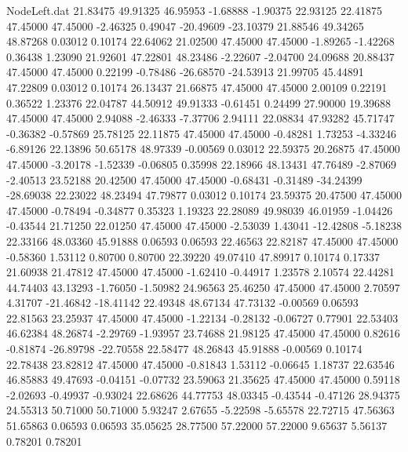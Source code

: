 \begin{filecontents}{NodeLeft.dat}
  21.83475   49.91325   46.95953    -1.68888   -1.90375   22.93125   22.41875   47.45000   47.45000   -2.46325    0.49047  -20.49609  -23.10379
  21.88546   49.34265   48.87268     0.03012    0.10174   22.64062   21.02500   47.45000   47.45000   -1.89265   -1.42268    0.36438    1.23090
  21.92601   47.22801   48.23486    -2.22607   -2.04700   24.09688   20.88437   47.45000   47.45000    0.22199   -0.78486  -26.68570  -24.53913
  21.99705   45.44891   47.22809     0.03012    0.10174   26.13437   21.66875   47.45000   47.45000    2.00109    0.22191    0.36522    1.23376
  22.04787   44.50912   49.91333    -0.61451    0.24499   27.90000   19.39688   47.45000   47.45000    2.94088   -2.46333   -7.37706    2.94111
  22.08834   47.93282   45.71747    -0.36382   -0.57869   25.78125   22.11875   47.45000   47.45000   -0.48281    1.73253   -4.33246   -6.89126
  22.13896   50.65178   48.97339    -0.00569    0.03012   22.59375   20.26875   47.45000   47.45000   -3.20178   -1.52339   -0.06805    0.35998
  22.18966   48.13431   47.76489    -2.87069   -2.40513   23.52188   20.42500   47.45000   47.45000   -0.68431   -0.31489  -34.24399  -28.69038
  22.23022   48.23494   47.79877     0.03012    0.10174   23.59375   20.47500   47.45000   47.45000   -0.78494   -0.34877    0.35323    1.19323
  22.28089   49.98039   46.01959    -1.04426   -0.43544   21.71250   22.01250   47.45000   47.45000   -2.53039    1.43041  -12.42808   -5.18238
  22.33166   48.03360   45.91888     0.06593    0.06593   22.46563   22.82187   47.45000   47.45000   -0.58360    1.53112    0.80700    0.80700
  22.39220   49.07410   47.89917     0.10174    0.17337   21.60938   21.47812   47.45000   47.45000   -1.62410   -0.44917    1.23578    2.10574
  22.44281   44.74403   43.13293    -1.76050   -1.50982   24.96563   25.46250   47.45000   47.45000    2.70597    4.31707  -21.46842  -18.41142
  22.49348   48.67134   47.73132    -0.00569    0.06593   22.81563   23.25937   47.45000   47.45000   -1.22134   -0.28132   -0.06727    0.77901
  22.53403   46.62384   48.26874    -2.29769   -1.93957   23.74688   21.98125   47.45000   47.45000    0.82616   -0.81874  -26.89798  -22.70558
  22.58477   48.26843   45.91888    -0.00569    0.10174   22.78438   23.82812   47.45000   47.45000   -0.81843    1.53112   -0.06645    1.18737
  22.63546   46.85883   49.47693    -0.04151   -0.07732   23.59063   21.35625   47.45000   47.45000    0.59118   -2.02693   -0.49937   -0.93024
  22.68626   44.77753   48.03345    -0.43544   -0.47126   28.94375   24.55313   50.71000   50.71000    5.93247    2.67655   -5.22598   -5.65578
  22.72715   47.56363   51.65863     0.06593    0.06593   35.05625   28.77500   57.22000   57.22000    9.65637    5.56137    0.78201    0.78201

\end{filecontents}
